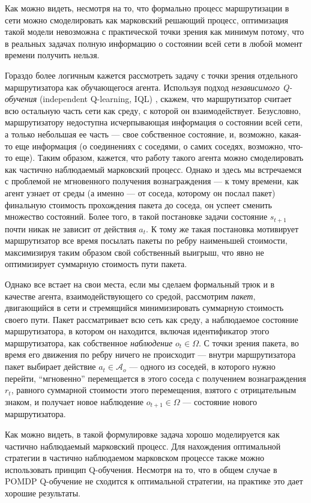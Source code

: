 \documentclass[specification, annotation]{itmo-student-thesis}
\begin{document}
Как можно видеть, несмотря на то, что формально процесс маршрутизации в сети
можно смоделировать как марковский решающий процесс, оптимизация такой модели
невозможна с практической точки зрения как минимум потому, что в реальных
задачах полную информацию о состоянии всей сети в любой момент времени получить
нельзя.

Гораздо более логичным кажется рассмотреть задачу с точки зрения отдельного
маршрутизатора как обучающегося агента. Используя подход \textit{независимого
  Q-обучения} (independent Q-learning, IQL) \cite{tan1993multi}, скажем, что
маршрутизатор считает всю остальную часть сети как среду, с которой он
взаимодействует. Безусловно, маршрутизатору недоступна исчерпывающая информация
о состоянии всей сети, а только небольшая ее часть --- свое собственное
состояние, и, возможно, какая-то еще информация (о соединениях с соседями, о
самих соседях, возможно, что-то еще). Таким образом, кажется, что работу такого
агента можно смоделировать как частично наблюдаемый марковский процесс. Однако и
здесь мы встречаемся с проблемой не мгновенного получения вознаграждения --- к
тому времени, как агент узнает от среды (а именно --- от соседа, которому он
послал пакет) финальную стоимость прохождения пакета до соседа, он успеет
сменить множество состояний. Более того, в такой постановке задачи состояние
$s_{t+1}$ почти никак не зависит от действия $a_t$. К тому же такая постановка
мотивирует маршрутизатор все время посылать пакеты по ребру наименьшей
стоимости, максимизируя таким образом свой собственный выигрыш, что явно не
оптимизирует суммарную стоимость пути пакета.

Однако все встает на свои места, если мы сделаем формальный трюк и в качестве
агента, взаимодействующего со средой, рассмотрим \textit{пакет}, двигающийся в
сети и стремящийся минимизировать суммарную стоимость своего пути. Пакет
рассматривает всю сеть как среду, а наблюдаемое состояние маршрутизатора, в
котором он находится, включая идентификатор этого маршрутизатора, как
собственное \textit{наблюдение}  $o_t \in \Omega$. С точки зрения пакета, во время
его движения по ребру ничего не происходит --- внутри маршрутизатора пакет
выбирает действие $a_t \in \mathcal{A}_o$ --- одного из соседей, в которого нужно
перейти, \enquote{мгновенно} перемещается в этого соседа с получением вознаграждения $r_t$,
равного суммарной стоимости этого перемещения, взятого с отрицательным знаком, и
получает новое наблюдение $o_{t+1} \in \Omega$ --- состояние нового маршрутизатора.

Как можно видеть, в такой формулировке задача хорошо моделируется как частично
наблюдаемый марковский процесс. Для нахождения оптимальной стратегии в частично
наблюдаемом марковском процессе также можно использовать принцип Q-обучения.
Несмотря на то, что в общем случае в POMDP Q-обучение не сходится к оптимальной
стратегии, на практике это дает хорошие результаты.
\end{document}
